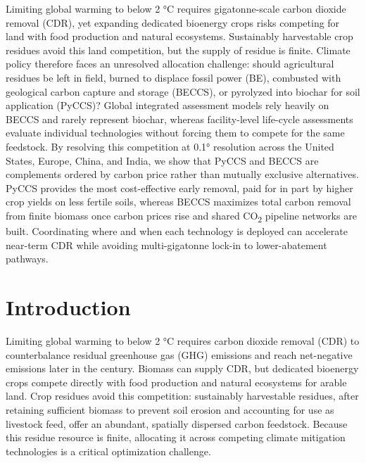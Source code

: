 \documentclass[
  letterpaper,
  twoside,
  twocolumn,
  9pt]{article}
\begin{document}
Limiting global warming to below 2 °C requires gigatonne-scale carbon
dioxide removal (CDR), yet expanding dedicated bioenergy crops risks
competing for land with food production and natural ecosystems.
Sustainably harvestable crop residues avoid this land competition, but
the supply of residue is finite. Climate policy therefore faces an
unresolved allocation challenge: should agricultural residues be left in
field, burned to displace fossil power (BE), combusted with geological
carbon capture and storage (BECCS), or pyrolyzed into biochar for soil
application (PyCCS)? Global integrated assessment models rely heavily on
BECCS and rarely represent biochar, whereas facility-level life-cycle
assessments evaluate individual technologies without forcing them to
compete for the same feedstock. By resolving this competition at 0.1°
resolution across the United States, Europe, China, and India, we show
that PyCCS and BECCS are complements ordered by carbon price rather than
mutually exclusive alternatives. PyCCS provides the most cost-effective
early removal, paid for in part by higher crop yields on less fertile
soils, whereas BECCS maximizes total carbon removal from finite biomass
once carbon prices rise and shared CO\textsubscript{2} pipeline networks
are built. Coordinating where and when each technology is deployed can
accelerate near-term CDR while avoiding multi-gigatonne lock-in to
lower-abatement pathways.

\section{Introduction}\label{introduction}

Limiting global warming to below 2 °C requires carbon dioxide removal
(CDR) to counterbalance residual greenhouse gas (GHG) emissions and
reach net-negative emissions later in the
century.\citep{unfccc2015paris, ipcc2022wg3} Biomass can supply CDR, but
dedicated bioenergy crops compete directly with food production and
natural ecosystems for arable land.\citep{fuss2018} Crop residues avoid
this competition: sustainably harvestable residues, after retaining
sufficient biomass to prevent soil erosion and accounting for use as
livestock feed, offer an abundant, spatially dispersed carbon
feedstock.\citep{karan2023, della2026productivity} Because this residue
resource is finite, allocating it across competing climate mitigation
technologies is a critical optimization
challenge.\citep{yue2025managing}
\end{document}
